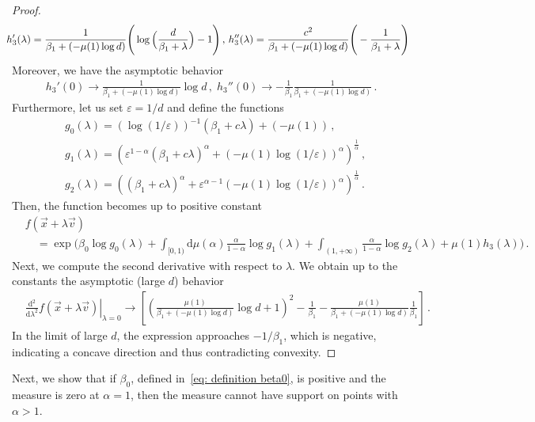 \documentclass[aps,pra,11pt,onecolumn,nofootinbib,tightenlines]{revtex4-2}
\theoremstyle{definition}
\def \d {\mathrm{d}}
\begin{document}
\begin{proof}
\begin{align}
    \hspace{-0.65em}h_3'(\lambda) = \frac{1}{\beta_1+(-\mu(1)\log{d})}\Bigg(\log{\Big(\frac{d}{\beta_1+\lambda}\Big)} -1\Bigg)\,, \,h_3''(\lambda) = \frac{c^2}{\beta_1+(-\mu(1)\log{d})}\Bigg(-\frac{1}{\beta_1+\lambda}\Bigg) 
\end{align}
Moreover, we have the asymptotic behavior
\begin{align}
     h_3'(0) \rightarrow  \frac{1}{\beta_1+(-\mu(1)\log{d})}\log{d} \,, \; h_3''(0) \rightarrow -\frac{1}{\beta_1} \frac{1}{\beta_1+(-\mu(1)\log{d})}\,.
\end{align}
Furthermore, let us set $\varepsilon=1/d$ and define the functions
\begin{align}
&g_0(\lambda)=(\log{(1/\varepsilon)})^{-1}(\beta_1+c\lambda)+(-\mu(1))\,,\\
&g_1(\lambda)=\left(\varepsilon^{1-\alpha}(\beta_1+c\lambda)^\alpha+(-\mu(1)\log{(1/\varepsilon)})^\alpha\right)^\frac{1}{\alpha}\,,\\
    & g_2(\lambda)=\left((\beta_1+c\lambda)^\alpha+\varepsilon^{\alpha-1}(-\mu(1)\log{(1/\varepsilon)})^\alpha\right)^\frac{1}{\alpha}\,.
\end{align}
Then, the function becomes up to positive constant
\begin{align}
    &f(\vec{x}+\lambda\vec{v}) \\
    &\quad =\exp\Bigg(\beta_0 \log{g_0(\lambda)}+\int_{[0,1)}\d \mu(\alpha)\frac{\alpha}{1-\alpha}\log{g_1(\lambda)} +\int_{(1,+\infty)}\frac{\alpha}{1-\alpha}\log{g_2(\lambda)} +\mu( 1) h_3(\lambda) \Bigg) \,.
\end{align}
Next, we compute the second derivative with respect to $\lambda$. 
We obtain up to the constants the asymptotic (large $d$) behavior
\begin{align}
    &\left.\frac{\d^2 }{\d\lambda^2}f(\vec{x}+\lambda\vec{v})\right\vert_{\lambda=0}  \rightarrow \left[\left( \frac{\mu(1)}{\beta_1+(-\mu(1)\log{d})}\log{d}+1\right)^2-\frac{1}{\beta_1}- \frac{\mu(1)}{\beta_1+(-\mu(1)\log{d})} \frac{1}{\beta_1} \right] \,.
\end{align}
In the limit of large $d$, the expression approaches $-1/\beta_1$, which is negative, indicating a concave direction and thus contradicting convexity.
\end{proof}

Next, we show that if $\beta_0$, defined in~\eqref{eq: definition beta0}, is positive and the measure is zero at $\alpha=1$, then the measure cannot have support on points with $\alpha > 1$.
\end{document}
